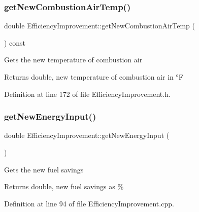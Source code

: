 \mbox{\label{class_efficiency_improvement_a6a699fe87fec378962c2ee1505600dce}} 
\subsubsection{\texorpdfstring{get\+New\+Combustion\+Air\+Temp()}{getNewCombustionAirTemp()}}
{\footnotesize\ttfamily double Efficiency\+Improvement\+::get\+New\+Combustion\+Air\+Temp (\begin{DoxyParamCaption}{ }\end{DoxyParamCaption}) const\hspace{0.3cm}{\ttfamily [inline]}}

Gets the new temperature of combustion air

\begin{DoxyReturn}{Returns}
double, new temperature of combustion air in °F 
\end{DoxyReturn}


Definition at line 172 of file Efficiency\+Improvement.\+h.

\mbox{\label{class_efficiency_improvement_a3c31caaed812edb8c465b53dc9029810}} 
\subsubsection{\texorpdfstring{get\+New\+Energy\+Input()}{getNewEnergyInput()}}
{\footnotesize\ttfamily double Efficiency\+Improvement\+::get\+New\+Energy\+Input (\begin{DoxyParamCaption}{ }\end{DoxyParamCaption})}

Gets the new fuel savings

\begin{DoxyReturn}{Returns}
double, new fuel savings as \% 
\end{DoxyReturn}


Definition at line 94 of file Efficiency\+Improvement.\+cpp.

